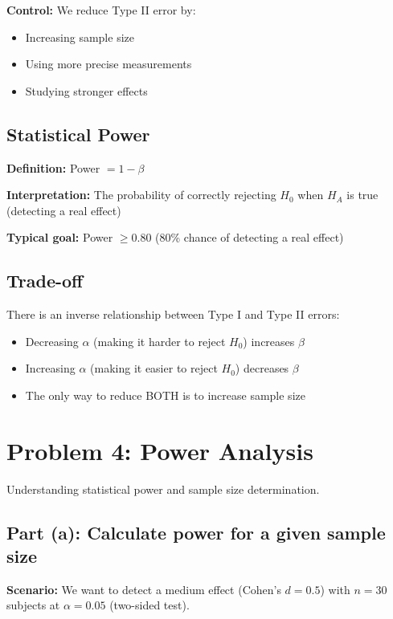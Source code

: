 \documentclass[11pt]{article}
\begin{document}
\textbf{Control:} We reduce Type II error by:
\begin{itemize}
\item Increasing sample size
\item Using more precise measurements
\item Studying stronger effects
\end{itemize}

\subsection*{Statistical Power}

\textbf{Definition:} Power $= 1 - \beta$

\textbf{Interpretation:} The probability of correctly rejecting $H_0$ when $H_A$ is true (detecting a real effect)

\textbf{Typical goal:} Power $\geq 0.80$ (80\% chance of detecting a real effect)

\subsection*{Trade-off}

There is an inverse relationship between Type I and Type II errors:
\begin{itemize}
\item Decreasing $\alpha$ (making it harder to reject $H_0$) increases $\beta$
\item Increasing $\alpha$ (making it easier to reject $H_0$) decreases $\beta$
\item The only way to reduce BOTH is to increase sample size
\end{itemize}

\vspace{12pt}

\section*{Problem 4: Power Analysis}

Understanding statistical power and sample size determination.

\subsection*{Part (a): Calculate power for a given sample size}

\textbf{Scenario:} We want to detect a medium effect (Cohen's $d = 0.5$) with $n = 30$ subjects at $\alpha = 0.05$ (two-sided test).
\end{document}

